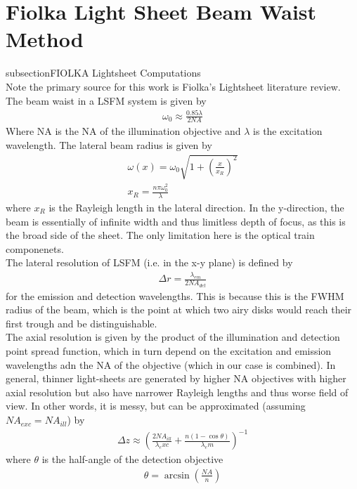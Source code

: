 \section{Fiolka Light Sheet Beam Waist Method}
subsection{FIOLKA Lightsheet Computations}\\
Note the primary source for this work is Fiolka's Lightsheet literature review. The beam waist in a LSFM system is given by 
\begin{gather}
    \omega_0 \approx \frac{0.85 \lambda}{2 NA}
\end{gather}
    Where NA is the NA of the illumination objective and $\lambda$ is the excitation wavelength. The lateral beam radius is given by 
    \begin{gather}
        \omega(x) = \omega_0 \sqrt{1 + \left(\frac{x}{x_R}\right)^2}\\
        x_R = \frac{n \pi \omega_0^2}{\lambda}
    \end{gather}
    where $x_R$ is the Rayleigh length in the lateral direction.
    In the y-direction, the beam is essentially of infinite width and thus limitless depth of focus, as this is the broad side of the sheet. The only limitation here is the optical train componenets.\\
    The lateral resolution of LSFM (i.e. in the x-y plane) is defined by 
    \begin{gather}
        \Delta r = \frac{\lambda_{em}}{2 NA_{det}}
    \end{gather}
    for the emission and detection wavelengths. This is because this is the FWHM radius of the beam, which is the point at which two airy disks would reach their first trough and be distinguishable.\\
    The axial resolution is given by the product of the illumination and detection point spread function, which in turn depend on the excitation and emission wavelengths adn the NA of the objective (which in our case is combined). In general, thinner light-sheets are generated by higher NA objectives with higher axial resolution but also have narrower Rayleigh lengths and thus worse field of view. In other words, it is messy, but can be approximated (assuming $NA_{exc}=NA_{ill}$) by
    \begin{gather}
        \Delta z \approx \left( \frac{2 NA_{ill}}{\lambda_exc} + \frac{n (1-\cos \theta)}{\lambda_em}\right)^{-1}
    \end{gather}
    where $\theta$ is the half-angle of the detection objective
    \begin{gather}
        \theta = \arcsin\left(\frac{NA}{n}\right)
    \end{gather}
